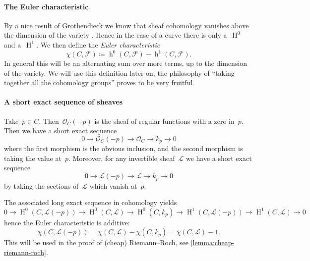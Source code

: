\documentclass[10pt,a4paper]{article}
\theoremstyle{lecture}
\DeclareMathOperator\hh{h}
\DeclareMathOperator\HH{H}
\begin{document}
\paragraph{The Euler characteristic}
By a nice result of Grothendieck we know that sheaf cohomology vanishes above the dimension of the variety \cite[theorem III.2.7]{hartshorne-algebraic-geometry}. Hence in the case of a curve there is only a~$\HH^0$ and a~$\HH^1$. We then define the \emph{Euler characteristic}
\begin{equation}
  \chi(C,\mathcal{F})\coloneqq\hh^0(C,\mathcal{F})-\hh^1(C,\mathcal{F}).
\end{equation}
In general this will be an alternating sum over more terms, up to the dimension of the variety. We will use this definition later on, the philosophy of ``taking together all the cohomology groups'' proves to be very fruitful.

\paragraph{A short exact sequence of sheaves}
Take~$p\in C$. Then~$\mathcal{O}_C(-p)$ is the sheaf of regular functions with a zero in~$p$. Then we have a short exact sequence
\begin{equation}
  0\to\mathcal{O}_C(-p)\to\mathcal{O}_C\to k_p\to 0
\end{equation}
where the first morphism is the obvious inclusion, and the second morphism is taking the value at~$p$. Moreover, for any invertible sheaf~$\mathcal{L}$ we have a short exact sequence
\begin{equation}
  0\to\mathcal{L}(-p)\to\mathcal{L}\to k_p\to 0
\end{equation}
by taking the sections of~$\mathcal{L}$ which vanish at~$p$.

The associated long exact sequence in cohomology yields
\begin{equation}
  0\to\HH^0(C,\mathcal{L}(-p))\to\HH^0(C,\mathcal{L})\to\HH^0(C,k_p)\to\HH^1(C,\mathcal{L}(-p))\to\HH^1(C,\mathcal{L})\to 0
\end{equation}
hence the Euler characteristic is additive:
\begin{equation}
  \chi(C,\mathcal{L}(-p))=\chi(C,\mathcal{L})-\chi(C,k_p)=\chi(C,\mathcal{L})-1.
\end{equation}
This will be used in the proof of (cheap) Riemann--Roch, see \cref{lemma:cheap-riemann-roch}.
\end{document}
